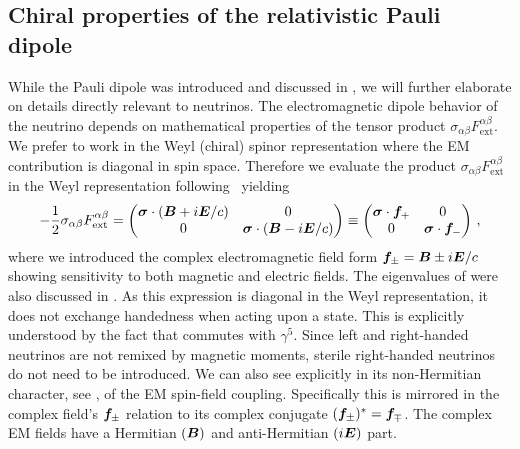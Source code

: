 \subsection{Chiral properties of the relativistic Pauli dipole}
\label{sec:nuem}
While the Pauli dipole was introduced and discussed in , we will further elaborate on details directly relevant to neutrinos. The electromagnetic dipole behavior of the neutrino depends on mathematical properties of the tensor product $\sigma_{\alpha\beta}F^{\alpha\beta}_\mathrm{ext}$. We prefer to work in the Weyl (chiral) spinor representation where the EM contribution is diagonal in spin space. Therefore we evaluate the product $\sigma_{\alpha\beta}F^{\alpha\beta}_\mathrm{ext}$ in the Weyl representation following~\cite{Feynman:1958ty} yielding
\begin{align}
\label{chiral:1}
-\frac{1}{2}\sigma_{\alpha\beta}F^{\alpha\beta}_\mathrm{ext}=
\begin{pmatrix}
\boldsymbol{\sigma}\cdot(\boldsymbol{B}+i\boldsymbol{E}/c) & 0\\
0 & \boldsymbol{\sigma}\cdot(\boldsymbol{B}-i\boldsymbol{E}/c)
\end{pmatrix}\equiv
\begin{pmatrix}
\boldsymbol{\sigma}\cdot\boldsymbol{f}_{+} & 0 \\
0 & \boldsymbol{\sigma}\cdot\boldsymbol{f}_{-}
\end{pmatrix}\,,
\end{align}
where we introduced the complex electromagnetic field form $\boldsymbol{f}_{\pm}=\boldsymbol{B}\pm i\boldsymbol{E}/c$ showing sensitivity to both magnetic and electric fields. The eigenvalues of  were also discussed in . As this expression is diagonal in the Weyl representation, it does not exchange handedness when acting upon a state. This is explicitly understood by the fact that  commutes with $\gamma^{5}$. Since left and right-handed neutrinos are not remixed by magnetic moments, sterile right-handed neutrinos do not need to be introduced. We can also see explicitly in  its non-Hermitian character, see , of the EM spin-field coupling. Specifically this is mirrored in the complex field's $\boldsymbol{f}_{\pm}$ relation to its complex conjugate $(\boldsymbol{f}_{\pm})^{*}=\boldsymbol{f}_{\mp}$. The complex EM fields have a Hermitian $(\boldsymbol{B})$ and anti-Hermitian $(i\boldsymbol{E})$ part.

